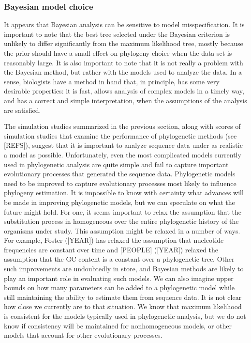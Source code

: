 \documentclass{svmult}
\begin{document}
\subsubsection{Bayesian model choice}


It appears that Bayesian analysis can be sensitive to model misspecification. It is important to note that the best tree selected under the Bayesian criterion is unlikely
to differ significantly from the maximum likelihood tree, mostly because the prior should have a small effect on phylogeny choice when the data set is reasonably
large. It is also important to note that it is not really a problem with the Bayesian method, but rather with the models used to analyze the data. In a sense, biologists
have a method in hand that, in principle, has some very desirable properties: it is fast, allows analysis of complex models in a timely way, and has a correct
and simple interpretation, when the assumptions of the analysis are satisfied. 

The simulation studies summarized in the previous section, along with scores of simulation studies that examine the performance of phylogenetic methods
(see [REFS]), suggest that it
is important to analyze sequence data under as realistic a model as possible. Unfortunately, even the most complicated models currently used in phylogenetic analysis 
are quite simple and fail to capture important evolutionary processes that generated the sequence data. Phylogenetic models need to be improved to
capture evolutionary processes most likely to influence phylogeny estimation. It is impossible to know with certainty what advances will be made in improving
phylogenetic models, but we can speculate on what the future might hold. For one, it seems important to
relax the assumption that the substitution process in homogeneous over the entire phylogenetic history of the organisms under study. This assumption might
be relaxed in a number of ways. For example, Foster ([YEAR]) has relaxed the assumption that nucleotide frequencies are constant over time and [PEOPLE]
([YEAR]) relaxed the assumption that the GC content is a constant over a phylogenetic tree. Other such improvements are undoubtedly in store, and Bayesian
methods are likely to play an important role in evaluating such models.
We can also imagine upper bounds on how many
parameters can be added to a phylogenetic model while still maintaining the ability to estimate them from sequence data. It is not clear how close we currently
are to that situation. We know that maximum likelihood is consistent for the models typically used in phylogenetic analysis, but we do not know if consistency
will be maintained for nonhomogeneous models, or other models that account for other evolutionary processes.
\end{document}
